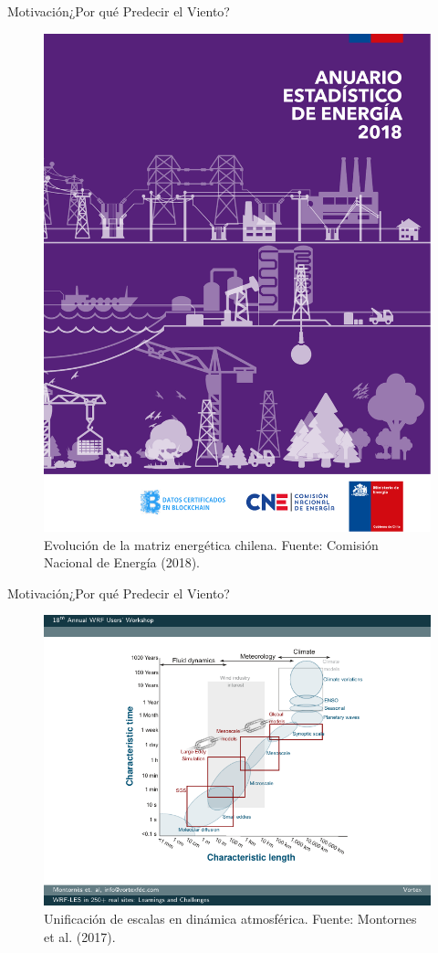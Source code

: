 \documentclass[mathserif,10pt]{beamer}
\begin{document}
\begin{frame}{Motivación}{¿Por qué Predecir el Viento?}
\begin{figure}
	\includegraphics[width=1.0\linewidth,page=30,trim={2cm 2.5cm 2.5cm 23.1cm},clip]{fig/01/Anuario-CNE-2018}
	\vspace{3mm}
	\caption{Evolución de la matriz energética chilena. Fuente: Comisión Nacional de Energía (2018).}
\end{figure}
\end{frame}

\begin{frame}{Motivación}{¿Por qué Predecir el Viento?}
	\begin{figure}
		\centering
		\includegraphics[width=0.7\linewidth,trim={2.6cm 1.4cm 1.5cm 0.8cm},clip]{fig/02/escalas}
		\vspace{-2mm}
		\caption{Unificación de escalas en dinámica atmosférica. Fuente: Montornes et al. (2017).}
	\end{figure}
\end{frame}
\end{document}

